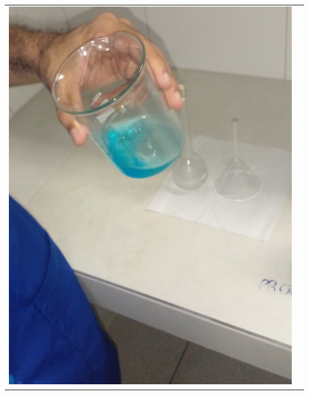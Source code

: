 \documentclass[a4paper, 11pt]{article}
\begin{document}
        \begin{center}
            \begin{tabular}{c c}
                \parbox{7cm}{\includegraphics[scale=0.2]{05. solubilizacao.jpeg}}

\end{tabular}
\end{center}
\end{document}
